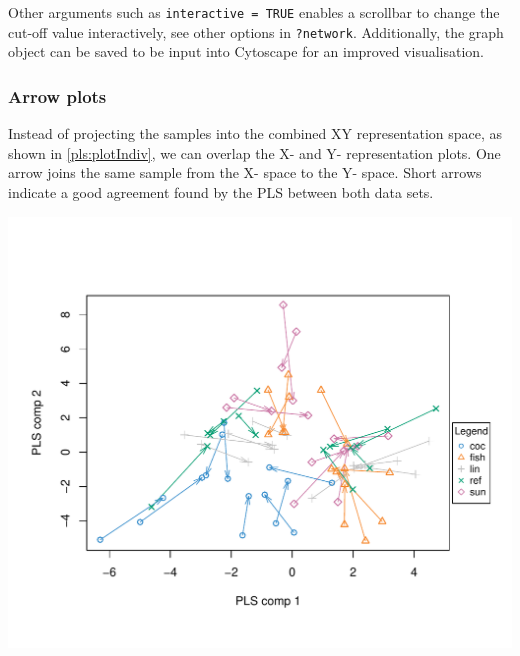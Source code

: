 \documentclass[]{book}
\newenvironment{Shaded}{\begin{snugshade}}{\end{snugshade}}
\newcommand{\CommentTok}[1]{\textcolor[rgb]{0.56,0.35,0.01}{\textit{#1}}}
\newcommand{\DataTypeTok}[1]{\textcolor[rgb]{0.13,0.29,0.53}{#1}}
\newcommand{\DecValTok}[1]{\textcolor[rgb]{0.00,0.00,0.81}{#1}}
\newcommand{\FloatTok}[1]{\textcolor[rgb]{0.00,0.00,0.81}{#1}}
\newcommand{\KeywordTok}[1]{\textcolor[rgb]{0.13,0.29,0.53}{\textbf{#1}}}
\newcommand{\NormalTok}[1]{#1}
\newcommand{\OperatorTok}[1]{\textcolor[rgb]{0.81,0.36,0.00}{\textbf{#1}}}
\newcommand{\OtherTok}[1]{\textcolor[rgb]{0.56,0.35,0.01}{#1}}
\newcommand{\StringTok}[1]{\textcolor[rgb]{0.31,0.60,0.02}{#1}}
\begin{document}
Other arguments such as \texttt{interactive\ =\ TRUE} enables a scrollbar to change the cut-off value interactively, see other options in \texttt{?network}. Additionally, the graph object can be saved to be input into Cytoscape for an improved visualisation.

\begin{Shaded}
\end{Shaded}

\hypertarget{arrow-plots}{%
\subsubsection{Arrow plots}\label{arrow-plots}}

Instead of projecting the samples into the combined XY representation space, as shown in \ref{pls:plotIndiv}, we can overlap the X- and Y- representation plots. One arrow joins the same sample from the X- space to the Y- space. Short arrows indicate a good agreement found by the PLS between both data sets.

\begin{Shaded}
\end{Shaded}

\begin{center}\includegraphics[width=0.5\linewidth,]{Figures/05-pls-plotArrow-1} \end{center}
\end{document}
